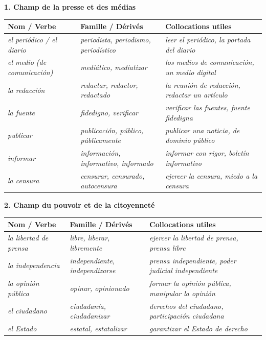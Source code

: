 \documentclass[11pt]{article}
\newcommand{\esp}[1]{\ifmmode\text{\textit{#1}}\else\begingroup\selectlanguage{spanish}\itshape #1\endgroup\fi}
\begin{document}
\begin{propriete}
\textbf{1. Champ de la presse et des médias}\par
\begin{center}
\begin{tabularx}{\linewidth}{|X|X|X|}\hline
\rowcolor{popblueL} \textbf{Nom / Verbe} & \textbf{Famille / Dérivés} & \textbf{Collocations utiles} \\ \hline
\esp{el periódico / el diario} & \esp{periodista, periodismo, periodístico} & \esp{leer el periódico, la portada del diario} \\ \hline
\esp{el medio (de comunicación)} & \esp{mediático, mediatizar} & \esp{los medios de comunicación, un medio digital} \\ \hline
\esp{la redacción} & \esp{redactar, redactor, redactado} & \esp{la reunión de redacción, redactar un artículo} \\ \hline
\esp{la fuente} & \esp{fidedigno, verificar} & \esp{verificar las fuentes, fuente fidedigna} \\ \hline
\esp{publicar} & \esp{publicación, público, públicamente} & \esp{publicar una noticia, de dominio público} \\ \hline
\esp{informar} & \esp{información, informativo, informado} & \esp{informar con rigor, boletín informativo} \\ \hline
\esp{la censura} & \esp{censurar, censurado, autocensura} & \esp{ejercer la censura, miedo a la censura} \\ \hline
\end{tabularx}
\end{center}

\textbf{2. Champ du pouvoir et de la citoyenneté}\par
\begin{center}
\begin{tabularx}{\linewidth}{|X|X|X|}\hline
\rowcolor{poporangeL} \textbf{Nom / Verbe} & \textbf{Famille / Dérivés} & \textbf{Collocations utiles} \\ \hline
\esp{la libertad de prensa} & \esp{libre, liberar, libremente} & \esp{ejercer la libertad de prensa, prensa libre} \\ \hline
\esp{la independencia} & \esp{independiente, independizarse} & \esp{prensa independiente, poder judicial independiente} \\ \hline
\esp{la opinión pública} & \esp{opinar, opinionado} & \esp{formar la opinión pública, manipular la opinión} \\ \hline
\esp{el ciudadano} & \esp{ciudadanía, ciudadanizar} & \esp{derechos del ciudadano, participación ciudadana} \\ \hline
\esp{el Estado} & \esp{estatal, estatalizar} & \esp{garantizar el Estado de derecho} \\ \hline
\end{tabularx}
\end{center}


\end{propriete}
\end{document}
